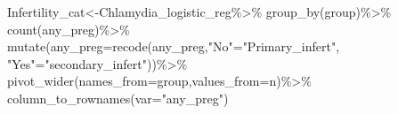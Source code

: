 \documentclass[
]{article}
\newenvironment{Shaded}{\begin{snugshade}}{\end{snugshade}}
\newcommand{\AttributeTok}[1]{\textcolor[rgb]{0.77,0.63,0.00}{#1}}
\newcommand{\FunctionTok}[1]{\textcolor[rgb]{0.00,0.00,0.00}{#1}}
\newcommand{\NormalTok}[1]{#1}
\newcommand{\OtherTok}[1]{\textcolor[rgb]{0.56,0.35,0.01}{#1}}
\newcommand{\SpecialCharTok}[1]{\textcolor[rgb]{0.00,0.00,0.00}{#1}}
\newcommand{\StringTok}[1]{\textcolor[rgb]{0.31,0.60,0.02}{#1}}
\begin{document}
\begin{Shaded}
\begin{Highlighting}[]
\NormalTok{Infertility\_cat}\OtherTok{\textless{}{-}}\NormalTok{Chlamydia\_logistic\_reg}\SpecialCharTok{\%\textgreater{}\%}
  \FunctionTok{group\_by}\NormalTok{(group)}\SpecialCharTok{\%\textgreater{}\%}
  \FunctionTok{count}\NormalTok{(any\_preg)}\SpecialCharTok{\%\textgreater{}\%}
  \FunctionTok{mutate}\NormalTok{(}\AttributeTok{any\_preg=}\FunctionTok{recode}\NormalTok{(any\_preg,}\StringTok{"No"}\OtherTok{=}\StringTok{"Primary\_infert"}\NormalTok{,}
                         \StringTok{"Yes"}\OtherTok{=}\StringTok{"secondary\_infert"}\NormalTok{))}\SpecialCharTok{\%\textgreater{}\%}
  \FunctionTok{pivot\_wider}\NormalTok{(}\AttributeTok{names\_from=}\NormalTok{group,}\AttributeTok{values\_from=}\NormalTok{n)}\SpecialCharTok{\%\textgreater{}\%}
  \FunctionTok{column\_to\_rownames}\NormalTok{(}\AttributeTok{var=}\StringTok{"any\_preg"}\NormalTok{)}




\end{Highlighting}
\end{Shaded}
\end{document}
